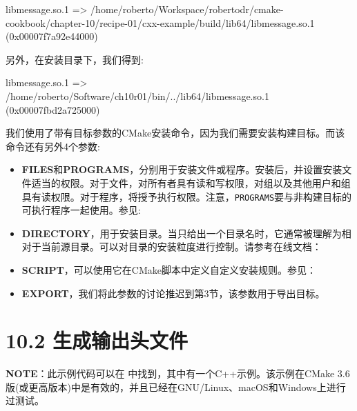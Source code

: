 \begin{codebox}[shell]
libmessage.so.1 => /home/roberto/Workspace/robertodr/cmake-
cookbook/chapter-10/recipe-01/cxx-example/build/lib64/libmessage.so.1
(0x00007f7a92e44000)
\end{codebox}

另外，在安装目录下，我们得到:

\begin{codebox}[shell]
libmessage.so.1 => /home/roberto/Software/ch10r01/bin/../lib64/libmessage.so.1 (0x00007fbd2a725000)
\end{codebox}

我们使用了带有目标参数的CMake安装命令，因为我们需要安装构建目标。而该命令还有另外4个参数:

\begin{itemize}
\item \textbf{FILES}和\textbf{PROGRAMS}，分别用于安装文件或程序。安装后，并设置安装文件适当的权限。对于文件，对所有者具有读和写权限，对组以及其他用户和组具有读权限。对于程序，将授予执行权限。注意，\texttt{PROGRAMS}要与非构建目标的可执行程序一起使用。参见: 

\item \textbf{DIRECTORY}，用于安装目录。当只给出一个目录名时，它通常被理解为相对于当前源目录。可以对目录的安装粒度进行控制。请参考在线文档： 

\item \textbf{SCRIPT}，可以使用它在CMake脚本中定义自定义安装规则。参见： 

\item \textbf{EXPORT}，我们将此参数的讨论推迟到第3节，该参数用于导出目标。

\end{itemize}


\section{10.2 生成输出头文件}

\begin{myInfoBox}
\textbf{NOTE}：此示例代码可以在  中找到，其中有一个C++示例。该示例在CMake 3.6版(或更高版本)中是有效的，并且已经在GNU/Linux、macOS和Windows上进行过测试。
\end{myInfoBox}

